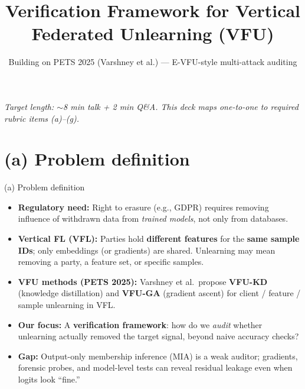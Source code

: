 \documentclass[11pt,aspectratio=169]{beamer}
\title{Verification Framework for Vertical Federated Unlearning (VFU)}
\subtitle{Building on PETS 2025 (Varshney et al.) --- E-VFU-style multi-attack auditing}
\author{}
\institute{ML Project --- \texttt{Part\_1.ipynb}, \texttt{Part\_2.ipynb}}
\date{}
\begin{document}
\begin{frame}
  \titlepage
  \vspace{-0.5em}
  \footnotesize\textit{Target length: $\sim$8 min talk + 2 min Q\&A. This deck maps one-to-one to required rubric items (a)--(g).}
\end{frame}

\section*{(a) Problem definition}
\begin{frame}{(a) Problem definition}
  \begin{itemize}
    \item \textbf{Regulatory need:} Right to erasure (e.g., GDPR) requires removing influence of withdrawn data from \emph{trained models}, not only from databases.
    \item \textbf{Vertical FL (VFL):} Parties hold \textbf{different features} for the \textbf{same sample IDs}; only embeddings (or gradients) are shared. Unlearning may mean removing a party, a feature set, or specific samples.
    \item \textbf{VFU methods (PETS 2025):} Varshney et al.\ propose \textbf{VFU-KD} (knowledge distillation) and \textbf{VFU-GA} (gradient ascent) for client / feature / sample unlearning in VFL.
    \item \textbf{Our focus:} A \textbf{verification framework}: how do we \emph{audit} whether unlearning actually removed the target signal, beyond naive accuracy checks?
    \item \textbf{Gap:} Output-only membership inference (MIA) is a weak auditor; gradients, forensic probes, and model-level tests can reveal residual leakage even when logits look ``fine.''
  \end{itemize}
\end{frame}

\end{document}
